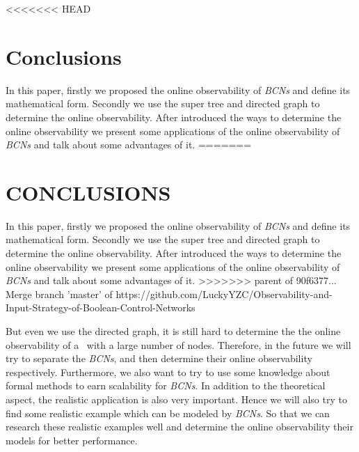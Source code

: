 <<<<<<< HEAD
\section{Conclusions}
\label{sec:con}
In this paper, firstly we proposed the online observability of {\em BCNs} and define its mathematical form. Secondly we use the super tree and directed graph to determine the online observability. After introduced the ways to determine the online observability we present some applications of the online observability of {\em BCNs} and talk about some advantages of it. 
=======
\section{CONCLUSIONS}

In this paper, firstly we proposed the online observability of {\em BCNs} and define its mathematical form. Secondly we use the super tree and directed graph to determine the online observability. After introduced the ways to determine the online observability we present some applications of the online observability of {\em BCNs} and talk about some advantages of it. %
>>>>>>> parent of 90f6377... Merge branch 'master' of https://github.com/LuckyYZC/Observability-and-Input-Strategy-of-Boolean-Control-Networks

But even we use the directed graph, it is still hard to determine the  the online observability of a \BCN\ with a large number of nodes. Therefore, in the future we will try to separate the {\em BCNs}, and then determine their online observability respectively. Furthermore, we also want to try to use some knowledge about formal methods to earn scalability for {\em BCNs}. In addition to the theoretical aspect, the realistic application is also very important. Hence we will also try to find some realistic example which can be modeled by {\em BCNs}. So that we can research these realistic examples well and determine the online observability their models for better performance.